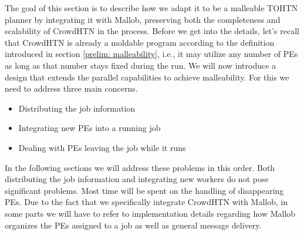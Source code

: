The goal of this section is to describe how we adapt it to be a malleable TOHTN planner by integrating it with Mallob, preserving both the completeness and scalability of CrowdHTN in the process. Before we get into the details, let's recall that CrowdHTN is already a moldable program according to the definition introduced in section \ref{prelim: malleability}, i.e., it may utilize any number of PEs as long as that number stays fixed during the run. We will now introduce a design that extends the parallel capabilities to achieve malleability. For this we need to address three main concerns.
\begin{itemize}
	\item Distributing the job information
	\item Integrating new PEs into a running job
	\item Dealing with PEs leaving the job while it runs
\end{itemize}
In the following sections we will address these problems in this order. Both distributing the job information and integrating new workers do not pose significant problems. Most time will be spent on the handling of disappearing PEs.
Due to the fact that we specifically integrate CrowdHTN with Mallob, in some parts we will have to refer to implementation details regarding how Mallob organizes the PEs assigned to a job as well as general message delivery.

